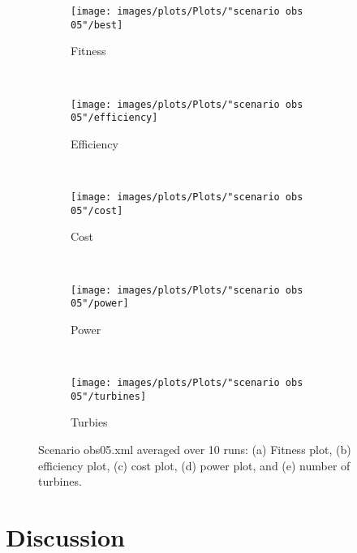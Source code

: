 \documentclass[12pt]{report}
\begin{document}
\begin{figure}[h!]
    \centering
      \begin{subfigure}[b]{0.31\textwidth}
        \texttt{[image: images/plots/Plots/"scenario obs 05"/best]}
        \caption{Fitness}
        \hfill
        \label{plot:fitness plot scenario obs 05}
    \end{subfigure}
    ~
      \begin{subfigure}[b]{0.31\textwidth}
        \texttt{[image: images/plots/Plots/"scenario obs 05"/efficiency]}
        \caption{Efficiency}
        \hfill
        \label{plot:single point crossover}
    \end{subfigure}
    ~
    \begin{subfigure}[b]{0.31\textwidth}
        \texttt{[image: images/plots/Plots/"scenario obs 05"/cost]}
        \caption{Cost}
        \hfill
        \label{plot:single point crossover}
    \end{subfigure}
    ~
    \begin{subfigure}[b]{0.31\textwidth}
        \texttt{[image: images/plots/Plots/"scenario obs 05"/power]}
        \caption{Power}
        \hfill
        \label{plot:two point crossover}
    \end{subfigure}
    ~
    \begin{subfigure}[b]{0.31\textwidth}
        \texttt{[image: images/plots/Plots/"scenario obs 05"/turbines]}
        \caption{Turbies}
        \hfill
        \label{plot:uniform crossover}
    \end{subfigure}
    \caption{Scenario obs05.xml averaged over 10 runs: (a) Fitness plot, (b) efficiency plot, (c) cost plot, (d) power plot, and (e) number of turbines.}
    \label{plot:master slave scenario obs 05}
\end{figure}


\section{Discussion}\label{section:discussion}
\end{document}
